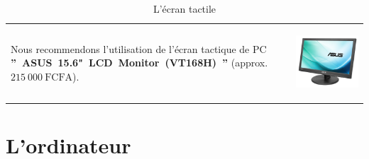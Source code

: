 \documentclass[12pt, a4paper]{article}
\newcommand{\money}[1]{$#1\ \text{FCFA}$}
\begin{document}
\begin{table}[!htbp]
\begin{tabular}{lr}
\parbox{25em}{
Nous recommendons l'utilisation de
l'\'ecran tactique de PC
\textbf{''~ASUS~15.6"~LCD~Monitor~(VT168H)~''}
(approx.~\money{215~000}).
\vspace{-3em}
}

&

\parbox{17em}{
\begin{center}
\includegraphics[scale=0.14]{images/asus-15_6-lcd-monitor.png}
\caption*{L'\'ecran tactile}
\end{center}
}
\end{tabular}
\end{table}

\vspace{-1.5em}
	\section{L'ordinateur}
\vspace{-3.71em}
\end{document}
